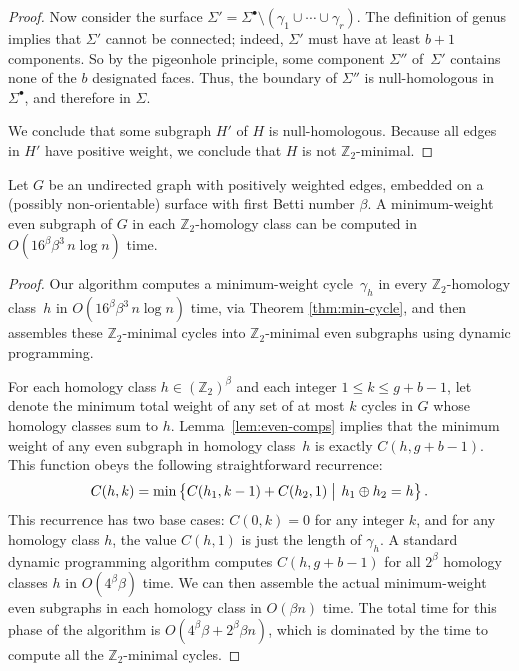 \documentclass[letterpaper,review]{siamart190516}
\def\Z{\mathbb{Z}}
\begin{document}
{\begin{proof}
Now consider the surface $\Sigma' = \Sigma^\bullet \setminus (\gamma_1 \cup \cdots \cup \gamma_r)$.  The definition of genus implies that $\Sigma'$ cannot be connected; indeed, $\Sigma'$ must have at least $b+1$ components.  So by the pigeonhole principle, some component $\Sigma''$ of~$\Sigma'$ contains none of the $b$ designated faces.  Thus, the boundary of $\Sigma''$ is null-homologous in $\Sigma^\bullet$, and therefore in $\Sigma$.


We conclude that some subgraph $H'$ of $H$ is null-homologous.  Because all edges in $H'$ have positive weight, we conclude that $H$ is not $\Z_2$-minimal.
\end{proof}

\begin{theorem}
\label{thm:min-even}
Let $G$ be an undirected graph with positively weighted edges, embedded on a (possibly non-orientable) surface with first Betti number $\beta$.  A minimum-weight even subgraph of $G$ in each $\Z_2$-homology class can be computed in $O(16^\beta \beta^3\, n\log n)$ time.
\end{theorem}

\begin{proof}
Our algorithm computes a minimum-weight cycle~$\gamma_h$ in every $\Z_2$-homology class~$h$ in $O(16^\beta \beta^3\, n\log n)$ time, via Theorem \ref{thm:min-cycle}, and then assembles these $\Z_2$-minimal cycles into $\Z_2$-minimal even subgraphs using dynamic programming.

For each homology class $h\in (\Z_2)^\beta$ and each integer $1\le k\le g+b-1$, let  denote the minimum total weight of any set of at most $k$ cycles in $G$ whose homology classes sum to $h$.  Lemma~\ref{lem:even-comps} implies that the minimum weight of any even subgraph in homology class~$h$ is exactly $C(h, g+b-1)$.  This function obeys the following straightforward recurrence:
\[
	C(h,k) = \min\Setbar{C(h_1,k-1) + C(h_2, 1)\strut}{h_1\oplus h_2 = h}.
\]
This recurrence has two base cases: $C(0, k) = 0$ for any integer $k$, and for any homology class $h$, the value $C(h,1)$ is just the length of $\gamma_h$.  A standard dynamic programming algorithm computes $C(h, g+b-1)$ for all $2^\beta$ homology classes $h$ in $O(4^\beta \beta)$ time.  We can then assemble the actual minimum-weight even subgraphs in each homology class in $O(\beta n)$ time.  The total time for this phase of the algorithm is $O(4^\beta \beta + 2^\beta \beta n)$, which is dominated by the time to compute all the $\Z_2$-minimal cycles.
\end{proof}

}
\end{document}
